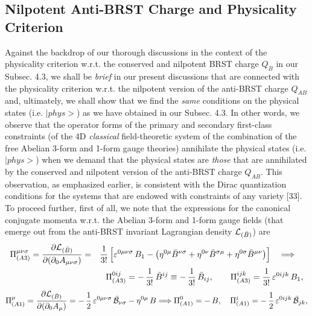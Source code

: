 \documentclass[12pt]{article}
\begin{document}
\subsection{Nilpotent Anti-BRST Charge and Physicality Criterion}




Against the backdrop of our thorough discussions in the context of the physicality criterion w.r.t. the 
conserved and nilpotent BRST charge $Q_B$ in our Subsec. 4.3, we 
shall be {\it brief} in our present discussions that are
connected with the physicality criterion w.r.t. the nilpotent version of the anti-BRST charge $Q_{AB}$ and, ultimately, we shall show that we find
the {\it same} conditions on the physical states (i.e. $|phys>$) as we have obtained in our Subsec. 4.3. In other words, we observe that the operator forms
of the primary and secondary first-class constraints (of the 4D {\it classical} field-theoretic system of the combination of the free Abelian 3-form and 1-form
gauge theories) annihilate the physical states (i.e. $|phys>$) when we demand that the physical states are {\it those} that are annihilated by the 
conserved and nilpotent version of the anti-BRST charge $Q_{AB}$. This observation, as emphasized earlier, is consistent with the Dirac quantization conditions for the systems that are endowed with constraints of any variety [33]. To proceed further, first of all, we note that the expressions for the canonical conjugate
momenta w.r.t. the Abelian 3-form and 1-form gauge fields (that emerge out from the anti-BRST invariant Lagrangian density ${\cal L}_{(\bar B)}$) are 
\begin{eqnarray}\label{64}
\Pi^{\mu\nu\sigma}_{(A3)} = \frac {\partial {\cal L}_{(\bar B)}}{\partial (\partial_0 A_{\mu\nu\sigma})} &=& \frac {1}{3!}\, 
\Big [ \varepsilon^{0\mu\nu\sigma}\, B_1 - \big (\eta^{0\mu} \bar B^{\nu\sigma} + \eta^{0\nu} \bar B^{\sigma\mu} 
+ \eta^{0\sigma} \bar B^{\mu\nu} \big ) \Big ]
\quad \Longrightarrow \quad 
\nonumber\\
&& \Pi^{0ij}_{(A3)}  = -\, \frac {1}{3!}\, \bar B^{ij} \equiv -\, \frac {1}{3!}\, \bar B_{ij}, \qquad \Pi^{ijk}_{(A3)}  = \frac {1}{3!}\,\varepsilon^{0ijk}\, B_1,
\end{eqnarray}
\begin{eqnarray}\label{65}
\Pi^{\mu}_{(A1)} = \frac {\partial {\cal L}_{(\bar B)}}{\partial (\partial_0 A_{\mu})} = -\,
\dfrac{1}{2}\, \varepsilon^{0\mu\nu\sigma}\, \bar {\cal B}_{\nu\sigma} - \eta^{0\mu}\, B \Longrightarrow  \Pi^{0}_{(A1)}  = -\, B, \quad
\Pi^{i}_{(A1)} = -\, \dfrac{1}{2}\, \varepsilon^{0ijk}\, \bar {\cal B}_{jk}, 
\end{eqnarray}
\end{document}
